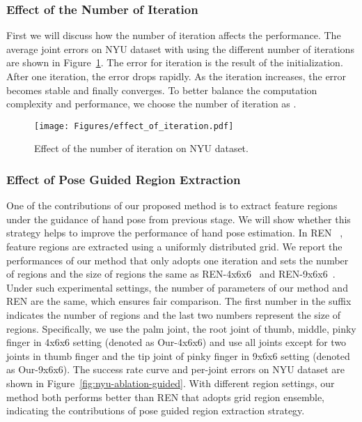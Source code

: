 \documentclass[final, 5p]{elsarticle}
\begin{document}
\subsubsection{Effect of the Number of Iteration }
\label{sec:ablation-iter}
First we will discuss how the number of iteration  affects the performance. The average joint errors on NYU dataset with using the different number of iterations are shown in Figure~\ref{fig:nyu-ablation-iteration}. The error for iteration  is the result of the initialization. After one iteration, the error drops rapidly. As the iteration increases, the error becomes stable and finally converges. To better balance the computation complexity and performance, we choose the number of iteration as .

\begin{figure}[!tb]
\centering
\centerline{\texttt{[image: Figures/effect\_of\_iteration.pdf]}}
\caption{Effect of the number of iteration on NYU dataset.}
\label{fig:nyu-ablation-iteration}
\end{figure}

\subsubsection{Effect of Pose Guided Region Extraction}
\label{sec:ablation-pose-guided}
One of the contributions of our proposed method is to extract feature regions under the guidance of hand pose from previous stage. We will show whether this strategy helps to improve the performance of hand pose estimation. In REN ~\cite{guo2017region}, feature regions are extracted using a uniformly distributed grid. We report the performances of our method that only adopts one iteration and sets the number of regions and the size of regions the same as REN-4x6x6~\cite{guo2017region} and REN-9x6x6~\cite{wang2018region}. Under such experimental settings, the number of parameters of our method and REN are the same, which ensures fair comparison. The first number in the suffix indicates the number of regions and the last two numbers represent the size of regions. Specifically, we use the palm joint, the root joint of thumb, middle, pinky finger in 4x6x6 setting (denoted as Our-4x6x6) and use all joints except for two joints in thumb finger and the tip joint of pinky finger in 9x6x6 setting (denoted as Our-9x6x6). The success rate curve and per-joint errors on NYU dataset are shown in Figure~\ref{fig:nyu-ablation-guided}. With different region settings, our method both performs better than REN that adopts grid region ensemble, indicating the contributions of pose guided region extraction strategy.
\end{document}

